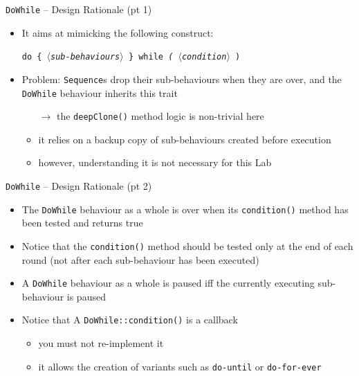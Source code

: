 \documentclass[presentation]{beamer}\mode<presentation>{\usetheme{AMSCesenaPurpleAndGold}}
\begin{document}
\begin{frame}[c, allowframebreaks]
\begin{exampleblock}{\texttt{DoWhile} -- Design Rationale (pt 1)}
\begin{itemize}
            \medskip

            \item It aims at mimicking the following construct:
            \begin{center}
                \texttt{do \{ \textit{$\langle$sub-behaviours$\rangle$} \} while \textit{( $\langle$condition$\rangle$} )}
            \end{center}


            \medskip

            \item Problem: \texttt{Sequence}s drop their sub-behaviours when they are over, and the \texttt{DoWhile} behaviour inherits this trait
            \begin{itemize}
                \item[$\rightarrow$] the \texttt{deepClone()} method logic is non-trivial here
                \item it relies on a \alert{backup} copy of sub-behaviours created before execution
                \item however, understanding it is not necessary for this Lab
            \end{itemize}

        \end{itemize}
    \end{exampleblock}

    \begin{exampleblock}{\texttt{DoWhile} -- Design Rationale (pt 2)}
        \begin{itemize}
            \item The \texttt{DoWhile} behaviour as a whole is \alert{over} when its \texttt{condition()} method has been tested and returns true

            \medskip

            \item Notice that the \texttt{condition()} method should be tested only \alert{at the end} of each round (not after each sub-behaviour has been executed)

            \medskip

            \item A \texttt{DoWhile} behaviour as a whole is \alert{paused} iff the currently executing sub-behaviour is paused

            \medskip

            \item Notice that A \texttt{DoWhile::\alert{condition()}} is a \alert{callback}
            \begin{itemize}
                \item you must \alert{not} re-implement it
                \item it allows the creation of \alert{variants} such as \texttt{do-until} or \texttt{do-for-ever}
            \end{itemize}
        \end{itemize}
    \end{exampleblock}


\end{frame}
\end{document}
